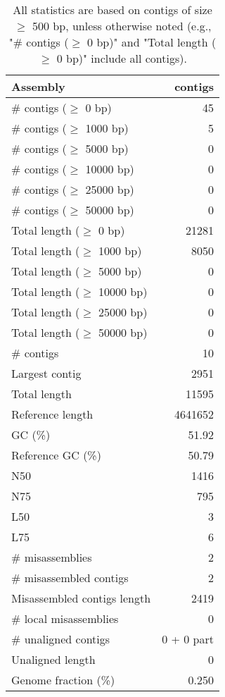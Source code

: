\documentclass[12pt,a4paper]{article}
\begin{document}
\begin{table}[ht]
\begin{center}
\caption{All statistics are based on contigs of size $\geq$ 500 bp, unless otherwise noted (e.g., "\# contigs ($\geq$ 0 bp)" and "Total length ($\geq$ 0 bp)" include all contigs).}
\begin{tabular}{|l*{1}{|r}|}
\hline
Assembly & contigs \\ \hline
\# contigs ($\geq$ 0 bp) & 45 \\ \hline
\# contigs ($\geq$ 1000 bp) & 5 \\ \hline
\# contigs ($\geq$ 5000 bp) & 0 \\ \hline
\# contigs ($\geq$ 10000 bp) & 0 \\ \hline
\# contigs ($\geq$ 25000 bp) & 0 \\ \hline
\# contigs ($\geq$ 50000 bp) & 0 \\ \hline
Total length ($\geq$ 0 bp) & 21281 \\ \hline
Total length ($\geq$ 1000 bp) & 8050 \\ \hline
Total length ($\geq$ 5000 bp) & 0 \\ \hline
Total length ($\geq$ 10000 bp) & 0 \\ \hline
Total length ($\geq$ 25000 bp) & 0 \\ \hline
Total length ($\geq$ 50000 bp) & 0 \\ \hline
\# contigs & 10 \\ \hline
Largest contig & 2951 \\ \hline
Total length & 11595 \\ \hline
Reference length & 4641652 \\ \hline
GC (\%) & 51.92 \\ \hline
Reference GC (\%) & 50.79 \\ \hline
N50 & 1416 \\ \hline
N75 & 795 \\ \hline
L50 & 3 \\ \hline
L75 & 6 \\ \hline
\# misassemblies & 2 \\ \hline
\# misassembled contigs & 2 \\ \hline
Misassembled contigs length & 2419 \\ \hline
\# local misassemblies & 0 \\ \hline
\# unaligned contigs & 0 + 0 part \\ \hline
Unaligned length & 0 \\ \hline
Genome fraction (\%) & 0.250 \\ \hline

\end{tabular}
\end{center}
\end{table}
\end{document}

